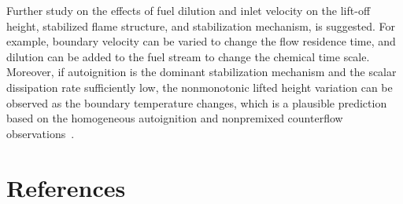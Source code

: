 \documentclass[review,3p,times]{elsarticle}
\begin{document}
Further study on the effects of fuel dilution and inlet velocity on the lift-off height, stabilized flame structure, and stabilization mechanism, is suggested.  For example, boundary velocity can be varied to change the flow residence time, and dilution can be added to the fuel stream to change the chemical time scale.  Moreover, if autoignition is the dominant stabilization mechanism and the scalar dissipation rate sufficiently low, the nonmonotonic lifted height variation can be observed as the boundary temperature changes, which is a plausible prediction based on the homogeneous autoignition and nonpremixed counterflow observations~\cite{deng14}.




\section*{References}



\renewcommand{\thefigure}{\arabic{figure}}
\renewcommand{\thetable}{\arabic{table}}
\end{document}
